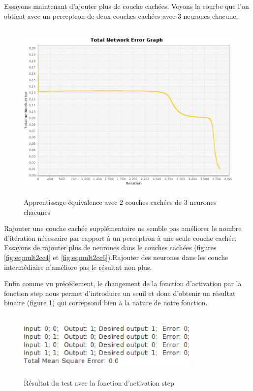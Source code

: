 \documentclass[twoside,openright,a4paper,11pt,french]{article}
\begin{document}
Essayons maintenant d'ajouter plus de couche cachées. Voyons la
courbe que l'on obtient avec un perceptron de deux couches cachées avec 3 
neurones chacune.

\begin{figure}[ht]
\centering
\includegraphics[width=12cm,height=9cm]{./pics/eq/multi_3_3_def.eps}
\caption{Apprentissage équivalence avec 2 couches cachées de 3 neurones chacunes}
\end{figure}


Rajouter une couche cachée supplémentaire ne semble pas améliorer le nombre d'itération
nécessaire par rapport à un perceptron à une seule couche cachée.  Essayons de
rajouter plus de neurones dans le couches cachées (figures \ref{fig:eqmult2cc4}
et \ref{fig:eqmult2cc6}).Rajouter des neurones dans les couche intermédiaire
n'améliore pas le résultat non plus.

Enfin comme vu précédement, le changement de la fonction d'activation par la
fonction step nous permet d'introduire un seuil et donc d'obtenir un résultat
binaire (figure \ref{fig:eqstep}) qui correpsond bien à la nature de notre
fonction. 

\begin{figure}[ht]
\centering
\includegraphics[width=9cm,height=3.3cm]{./pics/eq/stepeq.eps}
\caption{Résultat du test avec la fonction d'activation step}
\label{fig:eqstep}
\end{figure}
\end{document}
